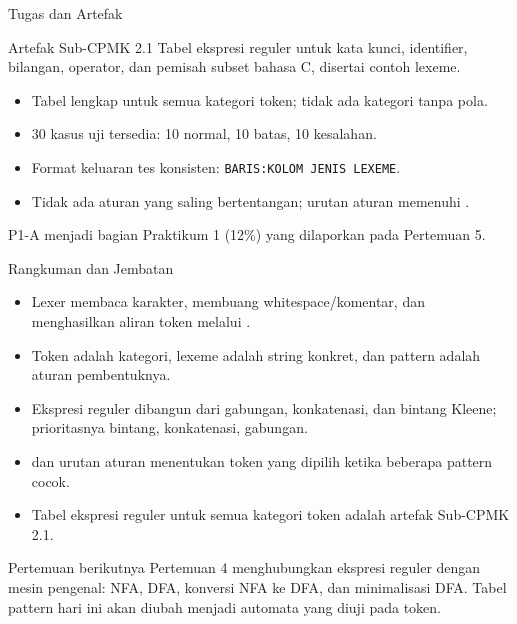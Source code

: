 \documentclass[aspectratio=169,10pt,t]{beamer}
\begin{document}
\begin{frame}{Tugas dan Artefak}
  \begin{block}{Artefak Sub-CPMK 2.1}
    Tabel ekspresi reguler untuk kata kunci, identifier, bilangan,
    operator, dan pemisah subset bahasa C, disertai contoh lexeme.
  \end{block}

  \small
  \begin{itemize}
    \item Tabel lengkap untuk semua kategori token; tidak ada kategori
          tanpa pola.
    \item 30 kasus uji tersedia: 10 normal, 10 batas, 10 kesalahan.
    \item Format keluaran tes konsisten:
          \texttt{BARIS:KOLOM JENIS LEXEME}.
    \item Tidak ada aturan yang saling bertentangan; urutan aturan
          memenuhi .
  \end{itemize}

  \vspace{3pt}
  {\footnotesize\color{ubbblue!75}P1-A menjadi bagian Praktikum 1
  (12\%) yang dilaporkan pada Pertemuan 5.}
\end{frame}

\begin{frame}{Rangkuman dan Jembatan}
  \begin{itemize}
    \item Lexer membaca karakter, membuang whitespace/komentar, dan
          menghasilkan aliran token melalui .
    \item Token adalah kategori, lexeme adalah string konkret, dan
          pattern adalah aturan pembentuknya.
    \item Ekspresi reguler dibangun dari gabungan, konkatenasi, dan
          bintang Kleene; prioritasnya bintang, konkatenasi, gabungan.
    \item {} dan urutan aturan menentukan token yang
          dipilih ketika beberapa pattern cocok.
    \item Tabel ekspresi reguler untuk semua kategori token adalah
          artefak Sub-CPMK 2.1.
  \end{itemize}

  \vspace{4pt}
  \begin{exampleblock}{Pertemuan berikutnya}
    Pertemuan 4 menghubungkan ekspresi reguler dengan mesin pengenal:
    NFA, DFA, konversi NFA ke DFA, dan minimalisasi DFA. Tabel pattern
    hari ini akan diubah menjadi automata yang diuji pada token.
  \end{exampleblock}
\end{frame}
\end{document}

